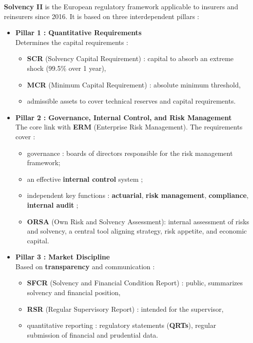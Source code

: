 	
\begin{f}
	
	\textbf{Solvency II} is the European regulatory framework applicable to insurers and reinsurers since 2016. It is based on three interdependent pillars :
	
	\begin{itemize}
		\item \textbf{Pillar 1 : Quantitative Requirements} \\
		Determines the capital requirements :
		\begin{itemize}
			\item \textbf{SCR} (Solvency Capital Requirement) : capital to absorb an extreme shock (99.5\% over 1 year),
			\item \textbf{MCR} (Minimum Capital Requirement) : absolute minimum threshold,
			\item admissible assets to cover technical reserves and capital requirements.
		\end{itemize}
		
		\item \textbf{Pillar 2 : Governance, Internal Control, and Risk Management} \\
		The core link with \textbf{ERM} (Enterprise Risk Management). The requirements cover :
		\begin{itemize}
			\item governance : boards of directors responsible for the risk management framework;
			\item an effective \textbf{internal control} system ;
			\item independent key functions : \textbf{actuarial}, \textbf{risk management}, \textbf{compliance}, \textbf{internal audit} ;
			\item \textbf{ORSA} (Own Risk and Solvency Assessment): internal assessment of risks and solvency, a central tool aligning strategy, risk appetite, and economic capital.
		\end{itemize}
		
		\item \textbf{Pillar 3 : Market Discipline} \\
		Based on \textbf{transparency} and communication :
		\begin{itemize}
			\item \textbf{SFCR} (Solvency and Financial Condition Report) : public, summarizes solvency and financial position,
			\item \textbf{RSR} (Regular Supervisory Report) : intended for the supervisor,
			\item quantitative reporting : regulatory statements (\textbf{QRTs}), regular submission of financial and prudential data.
		\end{itemize}
	\end{itemize}
		
\end{f}
